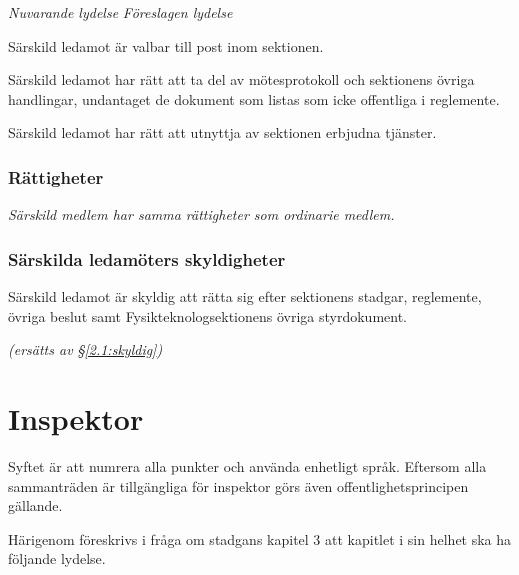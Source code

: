 \documentclass{article}
\newenvironment{lydelse}
    {\begin{paracol}{2}%
        \emph{Nuvarande lydelse}%
        \switchcolumn%
        \emph{Föreslagen lydelse}%
    \end{paracol}%
    \begin{enumerate}[label=\thesubsection.\arabic*]%
    \begin{paracol}{2}%
    }{\end{paracol}\end{enumerate}}
\newcommand{\itemb}{\item[\textbullet]}
\begin{document}
\begin{lydelse}
   \itemb Särskild ledamot är valbar till post inom sektionen.

   \itemb Särskild ledamot har rätt att ta del av mötesprotokoll och sektionens övriga handlingar, undantaget de dokument som listas som icke offentliga i reglemente.
   
   \itemb Särskild ledamot har rätt att utnyttja av sektionen erbjudna tjänster.
    
\switchcolumn
    \subsubsection*{Rättigheter}%

  


    \item \emph{Särskild medlem har samma rättigheter som ordinarie medlem.}

\switchcolumn*
    \subsubsection*{Särskilda ledamöters skyldigheter}%
    \itemb Särskild ledamot är skyldig att rätta sig efter sektionens stadgar, regle\-mente, övriga beslut samt  Fysikteknologsektionens övriga styrdokument.
    
\switchcolumn
    \emph{(ersätts av \S \ref{2.1:skyldig})}
\end{lydelse}

\section{Inspektor}
Syftet är att numrera alla punkter och använda enhetligt språk.
Eftersom alla sammanträden är tillgängliga för inspektor görs även offentlighetsprincipen gällande.

Härigenom föreskrivs i fråga om stadgans kapitel 3 att kapitlet i sin helhet ska ha följande lydelse.
\end{document}
